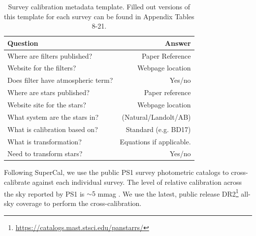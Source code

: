 \documentclass[twocolumn]{aastex63}
\begin{document}
\begin{table}
\centering
\begin{tabular}{lr}
\toprule
    Question & Answer \\
\hline

Where are filters published? & Paper Reference \\
Website for the filters? & Webpage location \\
Does filter have atmospheric term?	& Yes/no \\
Where are stars published? & Paper reference \\
Website site for the stars? & Webpage location \\
What system are the stars in? & (Natural/Landolt/AB) \\
What is calibration based on? & Standard (e.g. BD17) \\
What is transformation? & Equations if applicable. \\
Need to transform stars? & Yes/no
\end{tabular}
\caption{Survey calibration metadata template. Filled out versions of this template for each survey can be found in Appendix Tables 8-21.}
\label{tab:metainfo}
\end{table}


Following SuperCal, we use the public PS1 survey photometric catalogs \citep{Chambers16} to cross-calibrate against each individual survey. The level of relative calibration across the sky reported by PS1 is $\sim5$ mmag \citep{Schlafly16}.  We use the latest, public release DR2\footnote{\href{https://catalogs.mast.stsci.edu/panstarrs/}{https://catalogs.mast.stsci.edu/panstarrs/}} all-sky coverage to perform the cross-calibration.  
\end{document}
